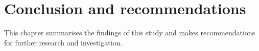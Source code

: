 \chapter{Conclusion and recommendations}\label{chap:conclusion}
\begin{overview}
  This chapter summarises the findings of this study and makes
  recommendations for further research and investigation.
\end{overview}


